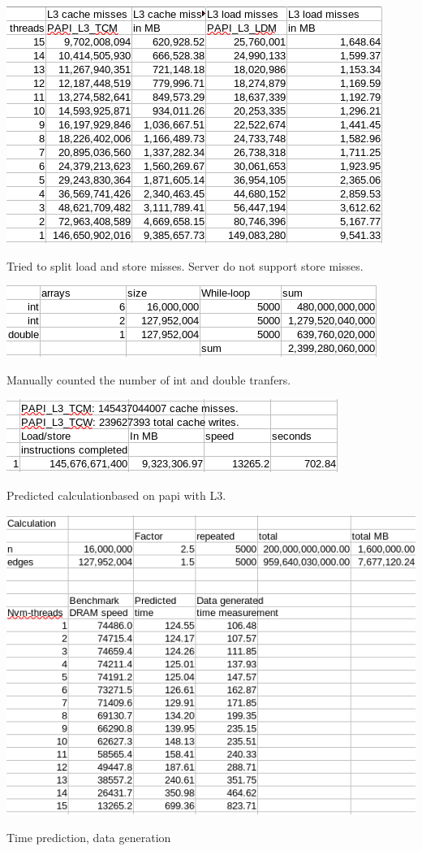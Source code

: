 \documentclass[12pt,a4paper,USenglish]{article}      %
\begin{document}
\begin{table}[!hbtp]
\includegraphics[scale=0.7]{Predicted_calculation_3.png}
\caption{Tried to split load and store misses. Server do not support store misses.}
\end{table}

\begin{table}[!hbtp]
\includegraphics[scale=0.7]{Array-counting.png}
\caption{Manually counted the number of int and double tranfers.}
\end{table}

\begin{table}[!hbtp]
\includegraphics[scale=0.7]{Predicted_calculation_2.png}
\caption{Predicted calculationbased on papi with L3.}
\end{table}

\begin{table}[!hbtp]
\includegraphics[scale=0.7]{Datagen_prediction_NVM.png}
\caption{Time prediction, data generation}
\end{table}
\end{document}
